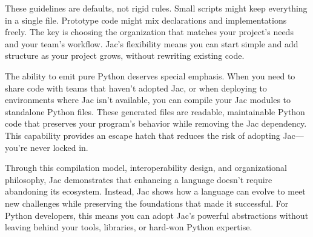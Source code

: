 These guidelines are defaults, not rigid rules. Small scripts might keep everything in a single file. Prototype code might mix declarations and implementations freely. The key is choosing the organization that matches your project's needs and your team's workflow. Jac's flexibility means you can start simple and add structure as your project grows, without rewriting existing code.

The ability to emit pure Python deserves special emphasis. When you need to share code with teams that haven't adopted Jac, or when deploying to environments where Jac isn't available, you can compile your Jac modules to standalone Python files. These generated files are readable, maintainable Python code that preserves your program's behavior while removing the Jac dependency. This capability provides an escape hatch that reduces the risk of adopting Jac—you're never locked in.

Through this compilation model, interoperability design, and organizational philosophy, Jac demonstrates that enhancing a language doesn't require abandoning its ecosystem. Instead, Jac shows how a language can evolve to meet new challenges while preserving the foundations that made it successful. For Python developers, this means you can adopt Jac's powerful abstractions without leaving behind your tools, libraries, or hard-won Python expertise.